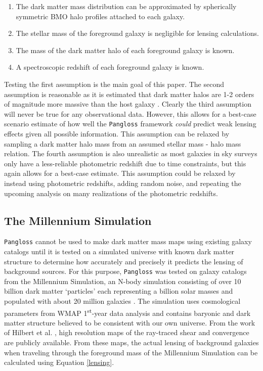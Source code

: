 \documentclass[%
 reprint,
 amsmath,amssymb,
 aps,nofootinbib
]{revtex4-1}
\begin{document}
\begin{enumerate}
\item The dark matter mass distribution can be approximated by spherically symmetric BMO halo profiles attached to each galaxy.
\item The stellar mass of the foreground galaxy is negligible for lensing calculations.
\item The mass of the dark matter halo of each foreground galaxy is known.
\item A spectroscopic redshift of each foreground galaxy is known.
\end{enumerate}

Testing the first assumption is the main goal of this paper. The second assumption is reasonable as it is estimated that dark matter halos are 1-2 orders of magnitude more massive than the host galaxy \cite{smhr}. Clearly the third assumption will never be true for any observational data. However, this allows for a best-case scenario estimate of how well the \texttt{Pangloss} framework \textit{could} predict weak lensing effects given all possible information. This assumption can be relaxed by sampling a dark matter halo mass from an assumed stellar mass - halo mass relation. The fourth assumption is also unrealistic as most galaxies in sky surveys only have a less-reliable photometric redshift due to time constraints, but this again allows for a best-case estimate. This assumption could be relaxed by instead using photometric redshifts, adding random noise, and repeating the upcoming analysis on many realizations of the photometric redshifts.

\subsection*{The Millennium Simulation}
\texttt{Pangloss} cannot be used to make dark matter mass maps using existing galaxy catalogs until it is tested on a simulated universe with known dark matter structure to determine how accurately and precisely it predicts the lensing of background sources. For this purpose, \texttt{Pangloss} was tested on galaxy catalogs from the Millennium Simulation, an N-body simulation consisting of over 10 billion dark matter `particles' each representing a billion solar masses and populated with about 20 million galaxies \cite{millennium_simulation}. The simulation uses cosmological parameters from WMAP 1\textsuperscript{st}-year data analysis and contains baryonic and dark matter structure believed to be consistent with our own universe. From the work of Hilbert et al. \cite{ray_tracing}, high resolution maps of the ray-traced shear and convergence are publicly available. From these maps, the actual lensing of background galaxies when traveling through the foreground mass of the Millennium Simulation can be calculated using Equation \eqref{lensing}.
\end{document}
